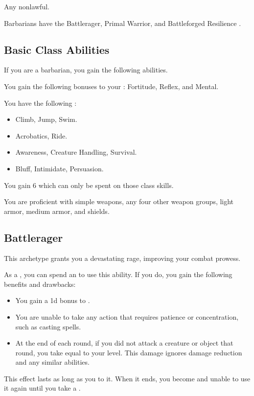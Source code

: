      Any nonlawful.

     Barbarians have the Battlerager, Primal Warrior, and Battleforged Resilience .

    \subsection{Basic Class Abilities}
        If you are a barbarian, you gain the following abilities.

        You gain the following bonuses to your :  Fortitude,  Reflex, and  Mental.

        You have the following :
        \begin{itemize}
            \item {} Climb, Jump, Swim.
            \item {} Acrobatics, Ride.
            \item {} Awareness, Creature Handling, Survival.
            \item {} Bluff, Intimidate, Persuasion.
        \end{itemize}
        You gain 6  which can only be spent on those class skills.

        You are proficient with simple weapons, any four other weapon groups, light armor, medium armor, and shields.

    \subsection{Battlerager}\label{Rage}
        This archetype grants you a devastating rage, improving your combat prowess.

        As a , you can spend an  to use this ability.
        If you do, you gain the following benefits and drawbacks:
        \begin{itemize}
            \item You gain a \plus1d bonus to .
            \item You are unable to take any action that requires patience or concentration, such as casting spells.
            \item At the end of each round, if you did not attack a creature or object that round, you take  equal to your level.
                This damage ignores damage reduction and any similar abilities.
        \end{itemize}
        This effect lasts as long as you  to it.
        When it ends, you become \fatigued and unable to use it again until you take a .

